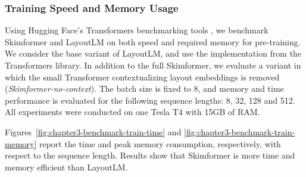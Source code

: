 \subsubsection{Training Speed and Memory Usage}

Using Hugging Face's Transformers benchmarking tools \citep{wolf2019huggingface}, we benchmark Skimformer and LayoutLM on both speed and required memory for pre-training. We consider the base variant of LayoutLM, and use the implementation from the Transformers library. In addition to the full Skimformer, we evaluate a variant in which the small Transformer contextualizing layout embeddings is removed (\textit{Skimformer-no-context}). The batch size is fixed to 8, and memory and time performance is evaluated for the following sequence lengths: 8, 32, 128 and 512. All experiments were conducted on one Tesla T4 with 15GB of RAM.


Figures~\ref{fig:chapter3-benchmark-train-time} and \ref{fig:chapter3-benchmark-train-memory} report the time and peak memory consumption, respectively, with respect to the sequence length. Results show that Skimformer is more time and memory efficient than LayoutLM. 

